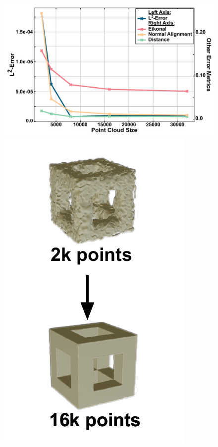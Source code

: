 \documentclass[12pt,openany]{book}
\theoremstyle{plainnormal}
\theoremstyle{remark}
\begin{document}
\begin{figure}[]
    \centering
    \begin{minipage}[c]{0.7\textwidth}
        \includegraphics[width=\textwidth]{Figures/conv_vis.pdf}
    \end{minipage}%
    \hfill
    \begin{minipage}[c]{0.2\textwidth}
        \centering
        \includegraphics[width=\textwidth]{Figures/convergence_vert.pdf}

\end{minipage}
\end{figure}
\end{document}
